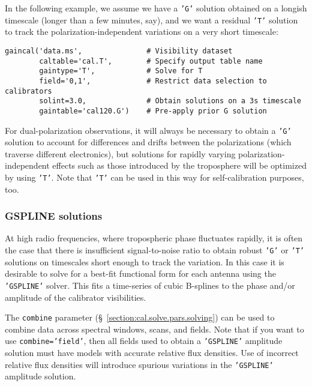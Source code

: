 {In the following example, we assume we have a {\tt 'G'} solution obtained on
a longish timescale (longer than a few minutes, say), and we want a residual
{\tt 'T'} solution to track the polarization-independent variations on a
very short timescale:

\small
\begin{verbatim}
gaincal('data.ms',               # Visibility dataset
        caltable='cal.T',        # Specify output table name
        gaintype='T',            # Solve for T
        field='0,1',             # Restrict data selection to calibrators
        solint=3.0,              # Obtain solutions on a 3s timescale
        gaintable='cal120.G')    # Pre-apply prior G solution
\end{verbatim}
\normalsize

For dual-polarization observations, it will always be necessary to
obtain a {\tt 'G'} solution to account for differences and drifts between
the polarizations (which traverse different electronics), but
solutions for rapidly varying polarization-independent effects such as
those introduced by the troposphere will be optimized by using {\tt 'T'}.
Note that {\tt 'T'} can be used in this way for self-calibration purposes,
too.

\subsubsection{GSPLINE solutions}
\label{section:cal.solve.gain.gspline}

At high radio frequencies, where tropospheric phase fluctuates
rapidly, it is often the case that there is insufficient
signal-to-noise ratio to obtain robust {\tt 'G'} or {\tt 'T'}
solutions on timescales short enough to track the 
variation.  In this case it is desirable to solve for a best-fit
functional form for each antenna using the {\tt 'GSPLINE'} solver.  
This fits a time-series of cubic B-splines to the phase and/or
amplitude of the calibrator visibilities.  

The {\tt combine} parameter (\S~\ref{section:cal.solve.pars.solving}) 
can be used to combine data across spectral windows, scans, and
fields.  Note that if you want to use {\tt combine='field'},
then all fields used to obtain a {\tt 'GSPLINE'} amplitude solution must have
models with accurate relative flux densities.  Use of incorrect
relative flux densities will introduce spurious variations in the
{\tt 'GSPLINE'} amplitude solution.

}
